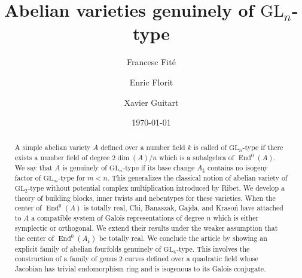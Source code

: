 \documentclass[oneside]{amsart}
\theoremstyle{remark}
\newcommand{\kbar}{{\bar{k}}}
\newcommand{\GL}{\mathrm{GL}}
\newcommand{\End}{\operatorname{End}}
\numberwithin{equation}{section}
\begin{document}
\title[Abelian varieties genuinely of $\GL_n$-type]{Abelian varieties genuinely of $\GL_n$-type}

\author{Francesc Fit\'e}
\address{Departament de Matemàtiques i Informàtica \\
Universitat de Barcelona and Centre de Recerca Matemàtica\\Gran via de les Corts Catalanes, 585\\
08007 Barcelona, Catalonia}

\author{Enric Florit}
\address{Estudis d'Informàtica, Multimèdia i Telecomunicació\\
Universitat Oberta de Catalunya\\Rambla del Poblenou, 156\\
08018 Barcelona, Catalonia}


\author{Xavier Guitart}
\address{Departament de Matemàtiques i Informàtica\\
Universitat de Barcelona and Centre de Recerca Matemàtica\\Gran via de les Corts Catalanes, 585\\
08007 Barcelona, Catalonia}

\date{\today}

\begin{abstract} A simple abelian variety $A$ defined over a number field $k$ is called of $\GL_n$-type if there exists a number field of degree $2\dim(A)/n$ which is a subalgebra of $\End^0(A)$. We say that $A$ is genuinely of $\GL_n$-type if its base change $A_\kbar$ contains no isogeny factor of $\GL_m$-type for $m<n$. This generalizes the classical notion of abelian variety of $\GL_2$-type without potential complex multiplication introduced by Ribet. We develop a theory of building blocks, inner twists and nebentypes for these varieties.  When the center of $\End^0(A)$ is totally real, Chi, Banaszak, Gajda, and Kraso\'n have attached to $A$ a  compatible system of Galois representations of degree $n$ which is either symplectic or orthogonal. We extend their results under the weaker assumption that the center of $\End^0(A_\kbar)$ be totally real. We conclude the article by showing an explicit family of abelian fourfolds genuinely of $\GL_4$-type. This involves the construction of a family of genus 2 curves defined over a quadratic field whose Jacobian has trivial endomorphism ring and is isogenous to its Galois conjugate.
\end{abstract}
\maketitle
\tableofcontents
\end{document}
